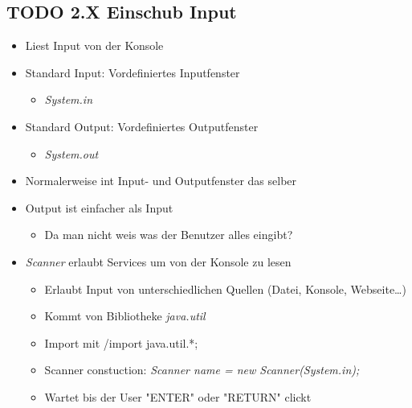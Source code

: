 \documentclass[11pt]{article}
\begin{document}
\subsection{{\bfseries\sffamily TODO} 2.X Einschub Input}
\label{sec:orgae41e05}
\begin{itemize}
\item Liest Input von der Konsole\\
\item Standard Input: Vordefiniertes Inputfenster\\
\begin{itemize}
\item \emph{System.in}\\
\end{itemize}
\item Standard Output: Vordefiniertes Outputfenster\\
\begin{itemize}
\item \emph{System.out}\\
\end{itemize}
\item Normalerweise int Input- und Outputfenster das selber\\
\item Output ist einfacher als Input\\
\begin{itemize}
\item Da man nicht weis was der Benutzer alles eingibt?\\
\end{itemize}
\item \emph{Scanner} erlaubt Services um von der Konsole zu lesen\\
\begin{itemize}
\item Erlaubt Input von unterschiedlichen Quellen (Datei, Konsole, Webseite\ldots{})\\
\item Kommt von Bibliotheke \emph{java.util}\\
\item Import mit /import java.util.*;\\
\item Scanner constuction: \emph{Scanner name = new Scanner(System.in);}\\
\item Wartet bis der User "ENTER" oder "RETURN" clickt\\
\end{itemize}
\end{itemize}
\end{document}
